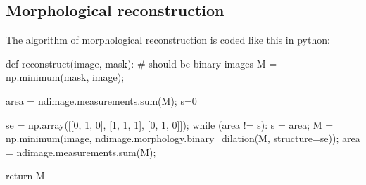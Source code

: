 \subsection{Morphological reconstruction}
The algorithm of morphological reconstruction is coded like this in python:

\begin{python}
def reconstruct(image, mask):
    # should be binary images
    M = np.minimum(mask, image);
    
    area = ndimage.measurements.sum(M);
    s=0
    
    se = np.array([[0, 1, 0], [1, 1, 1], [0, 1, 0]]);
    while (area != s):
        s = area;
        M = np.minimum(image, ndimage.morphology.binary_dilation(M, structure=se));
        area = ndimage.measurements.sum(M);
        
    return M
\end{python}

